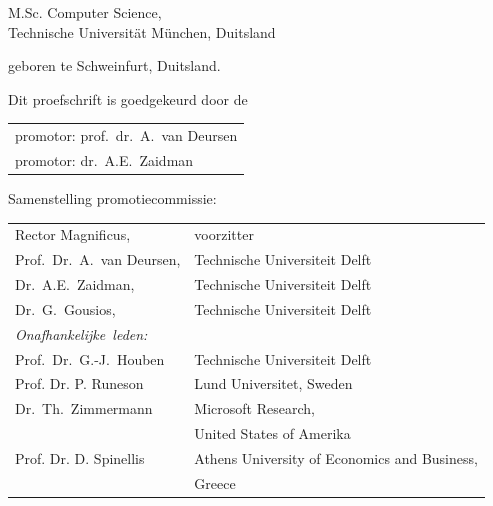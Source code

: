 \begin{titlepage}
\begin{center}
\bigskip
\bigskip

M.Sc. Computer Science, \\
Technische Universität München, Duitsland

geboren te Schweinfurt, Duitsland.

\vspace*{2\bigskipamount}

\end{center}

\clearpage
\thispagestyle{empty}

\noindent Dit proefschrift is goedgekeurd door de

\medskip\noindent
\begin{tabular}{l}
    promotor: prof.\ dr.\ A.\ van Deursen \\
    promotor: dr.\ A.E.\ Zaidman
\end{tabular}

\bigskip
\noindent Samenstelling promotiecommissie:

\medskip\noindent
\begin{tabular}{p{3.6cm}l}
    Rector Magnificus, & voorzitter \\
    Prof.\ Dr.\ A.\ van Deursen, & Technische Universiteit Delft \\
    Dr.\ A.E.\ Zaidman, & Technische Universiteit Delft \\
    Dr.\ G.\ Gousios, & Technische Universiteit Delft \\

    \medskip
    \mbox{\emph{Onafhankelijke leden:}} & \\

    Prof.\ Dr.\ G.-J.\ Houben & Technische Universiteit Delft \\
    Prof. Dr. P. Runeson & Lund Universitet, Sweden \\
    Dr.\ Th.\ Zimmermann & Microsoft Research, \\ &United States of Amerika \\
    Prof. Dr. D. Spinellis & Athens University of Economics and Business, \\& Greece \\


\end{tabular}
\end{titlepage}
